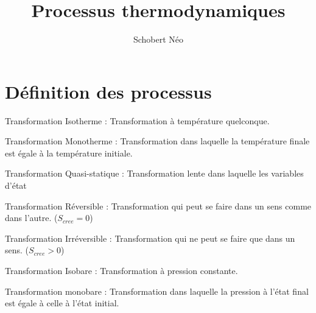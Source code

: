 \documentclass[a4paper, 11pt, hidelinks]{article}
\begin{document}
\newcommand{\grad}[1]{\vv{grad}#1}


\title{Processus thermodynamiques}
\author{Schobert Néo}

\maketitle

\tableofcontents


\newpage 


\section{Définition des processus}

\begin{definition}
    Transformation Isotherme : Transformation à température quelconque. 
\end{definition}



\begin{definition}
    Transformation Monotherme : Transformation dans laquelle la température finale est égale à la température initiale.
\end{definition}



\begin{definition}
    Transformation Quasi-statique : Transformation lente dans laquelle les variables d'état
\end{definition}



\begin{definition}
    Transformation Réversible : Transformation qui peut se faire dans un sens comme dans l'autre. ($S_{cree}=0$)
\end{definition}



\begin{definition}
    Transformation Irréversible : Transformation qui ne peut se faire que dans un sens. ($S_{cree} > 0$)
\end{definition}



\begin{definition}
    Transformation Isobare : Transformation à pression constante.
\end{definition}



\begin{definition}
    Transformation monobare : Transformation dans laquelle la pression à l'état final est égale à celle à l'état initial. 
\end{definition}
\end{document}

